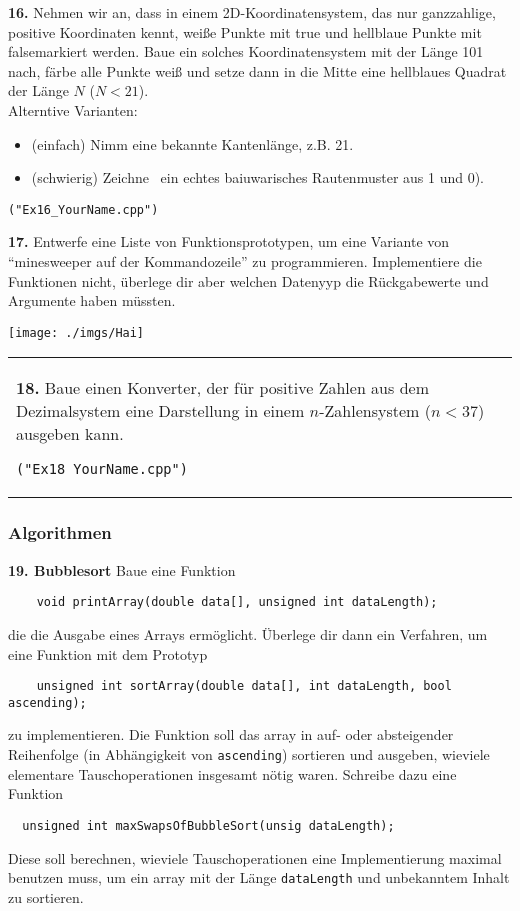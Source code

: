 \documentclass[paper=A4, pagesize, DIV=calc, smallheadings,
fontsize=11pt, expansion=false]{scrreprt}
\begin{document}
\textbf{16.} Nehmen wir an, dass in einem 2D-Koordinatensystem, das nur ganzzahlige, positive Koordinaten kennt, weiße Punkte mit \glqq true \grqq und hellblaue Punkte mit \glqq false\grqq markiert werden. Baue ein solches Koordinatensystem mit der Länge 101 nach, färbe alle Punkte weiß und setze dann in die Mitte eine hellblaues Quadrat der Länge $N$ ($N < 21$).\\
Alterntive Varianten:
\begin{itemize} \item (einfach) Nimm eine bekannte Kantenlänge, z.B. 21.
\item (schwierig) \glqq Zeichne\grqq~ ein echtes baiuwarisches Rautenmuster aus 1 und 0).
\end{itemize}
\begin{verbatim}
("Ex16_YourName.cpp")
\end{verbatim}



\textbf{17.} Entwerfe eine Liste von Funktionsprototypen, um eine Variante von ``minesweeper auf der Kommandozeile'' zu programmieren. Implementiere die Funktionen nicht, überlege dir aber welchen Datenyyp die Rückgabewerte und Argumente haben müssten.\\

\begin{minipage}[H]{0.3\linewidth}
\texttt{[image: ./imgs/Hai]}
\end{minipage}
\begin{tabular}{m{30em}}
\textbf{18.}  Baue einen Konverter, der für positive Zahlen aus dem Dezimalsystem eine Darstellung in einem $n$-Zahlensystem ($n < 37$) ausgeben kann.
\begin{verbatim}
("Ex18_YourName.cpp")
\end{verbatim}
\end{tabular}






\newpage
\subsubsection{Algorithmen}
\textbf{19. Bubblesort}
Baue eine Funktion
\begin{verbatim}
    void printArray(double data[], unsigned int dataLength);
\end{verbatim}
die die Ausgabe eines Arrays ermöglicht.
Überlege dir dann ein Verfahren, um eine Funktion mit dem Prototyp
\begin{verbatim}
    unsigned int sortArray(double data[], int dataLength, bool ascending);
\end{verbatim}    
zu implementieren.
  Die Funktion soll das array in auf- oder absteigender Reihenfolge (in Abhängigkeit von \texttt{ascending}) sortieren und ausgeben, wieviele elementare Tauschoperationen insgesamt nötig waren.
  Schreibe dazu eine Funktion
\begin{verbatim}
  unsigned int maxSwapsOfBubbleSort(unsig dataLength);
\end{verbatim}
  Diese soll berechnen, wieviele Tauschoperationen eine Implementierung maximal benutzen muss, um ein array mit der Länge \texttt{dataLength} und unbekanntem Inhalt zu sortieren.
\end{document}
